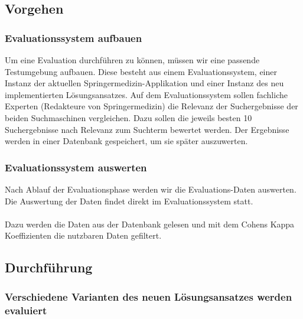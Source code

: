 \subsection{Vorgehen}
\label{sec:Evaluation:Aufbau:Vorgehen}

\subsubsection{Evaluationssystem aufbauen}
\label{sec:Evaluation:Aufbau:Vorgehen:Aufbau}

Um eine Evaluation durchführen zu können, müssen wir eine passende Testumgebung aufbauen. Diese besteht aus einem Evaluationssystem, einer Instanz der aktuellen Springermedizin-Applikation und einer Instanz des neu implementierten Lösungsansatzes. Auf dem Evaluationssystem sollen fachliche Experten (Redakteure von Springermedizin) die Relevanz der Suchergebnisse  der beiden Suchmaschinen vergleichen. Dazu sollen die jeweils besten 10 Suchergebnisse nach Relevanz zum Suchterm bewertet werden. Der Ergebnisse werden in einer Datenbank gespeichert, um sie später auszuwerten. 

\subsubsection{Evaluationssystem auswerten}
\label{sec:Evaluation:Aufbau:Vorgehen:Auswerten}

Nach Ablauf der Evaluationsphase werden wir die Evaluations-Daten auswerten. Die Auswertung der Daten findet direkt im Evaluationssystem statt. 
\\
\\
Dazu werden die Daten aus der Datenbank gelesen und mit dem Cohens Kappa Koeffizienten die nutzbaren Daten gefiltert. 


\subsection{Durchführung}
\label{sec:Evaluation:Aufbau:Durchfuehrung}

\subsubsection{Verschiedene Varianten des neuen Lösungsansatzes werden evaluiert}
\label{sec:Evaluation:Aufbau:Durchfuehrung:EvaluationsdatenVarianteLoesungsansatzes}

